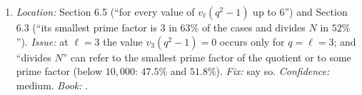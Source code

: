 \begin{sloppypar}
\begin{enumerate}[resume*=errata]
$828$ of the $1{,}293$ with one, for instance ). \emph{Fix:} one sentence on each. \emph{Confidence:} medium-high (the facts are recomputed; whether the paper's runs did so is unknown). \emph{Book:} .
\item\label{err:paper:wording-data} \emph{Location:} Section 6.5 (``for every value of $v_\ell(q^2-1)$ up to $6$'') and Section 6.3 (``its smallest prime factor is $3$ in $63\%$ of the cases and divides $N$ in $52\%$'').
\emph{Issue:} at $\ell=3$ the value $v_3(q^2-1)=0$ occurs only for $q=\ell=3$; and ``divides $N$'' can refer to the smallest prime factor of the quotient or to some prime factor (below $10{,}000$:
$47.5\%$ and $51.8\%$). \emph{Fix:} say so. \emph{Confidence:} medium. \emph{Book:} .
\end{enumerate}


\end{sloppypar}
